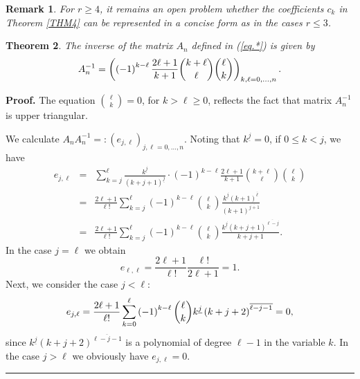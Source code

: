 \documentclass[12pt,reqno]{article}
\newtheorem{theorem}{Theorem}
\newtheorem{remark}[theorem]{Remark}
\newenvironment{proof}[1][Proof]{\noindent\textbf{#1.} }{\ \rule{0.5em}{0.5em}}
\begin{document}
\begin{remark}
For $r\geq 4$, it remains an open problem whether the coefficients $c_{k}$
in Theorem \ref{THM4} can be represented in a concise form as in the cases $%
r\leq 3$.
\end{remark}

\begin{theorem}
The inverse of the matrix $A_{n}$ defined in (\ref{eq.*}) is given by 
\begin{equation*}
A_{n}^{-1}=\left( \left( -1\right) ^{k-\ell }\frac{2\ell +1}{k+1}\binom{%
k+\ell }{\ell }\binom{\ell }{k}\right) _{k,\ell =0,\ldots ,n}.
\end{equation*}
\end{theorem}

\begin{proof}
The equation $\binom{\ell }{k}=0$, for $k>\ell \geq 0$, reflects the fact
that matrix $A_{n}^{-1}$ is upper triangular.

We calculate $A_{n}A_{n}^{-1}=:\left( e_{j,\ell }\right) _{j,\ell =0,\ldots
,n}$. Noting that $k^{\underline{j}}=0$, if $0\leq k<j$, we have 
\begin{eqnarray*}
e_{j,\ell } &=&\sum_{k=j}^{\ell }\frac{k^{\underline{j}}}{\left(
k+j+1\right) ^{\underline{j}}}\cdot \left( -1\right) ^{k-\ell }\frac{2\ell +1%
}{k+1}\binom{k+\ell }{\ell }\binom{\ell }{k} \\
&=&\frac{2\ell +1}{\ell !}\sum_{k=j}^{\ell }\left( -1\right) ^{k-\ell }%
\binom{\ell }{k}\frac{k^{\underline{j}}\left( k+1\right) ^{\overline{\ell }}%
}{\left( k+1\right) ^{\overline{j+1}}} \\
&=&\frac{2\ell +1}{\ell !}\sum_{k=j}^{\ell }\left( -1\right) ^{k-\ell }%
\binom{\ell }{k}\frac{k^{\underline{j}}\left( k+j+1\right) ^{\overline{\ell
-j}}}{k+j+1}.
\end{eqnarray*}%
In the case $j=\ell $ we obtain 
\begin{equation*}
e_{\ell ,\ell }=\frac{2\ell +1}{\ell !}\frac{\ell !}{2\ell +1}=1.
\end{equation*}%
Next, we consider the case $j<\ell $: 
\begin{equation*}
e_{j,\ell }=\frac{2\ell +1}{\ell !}\sum_{k=0}^{\ell }\left( -1\right)
^{k-\ell }\binom{\ell }{k}k^{\underline{j}}\left( k+j+2\right) ^{\overline{%
\ell -j-1}}=0,
\end{equation*}%
since $k^{\underline{j}}\left( k+j+2\right) ^{\overline{\ell -j-1}}$ is a
polynomial of degree $\ell -1$ in the variable $k$. In the case $j>\ell $ we
obviously have $e_{j,\ell }=0$.
\end{proof}
\end{document}
